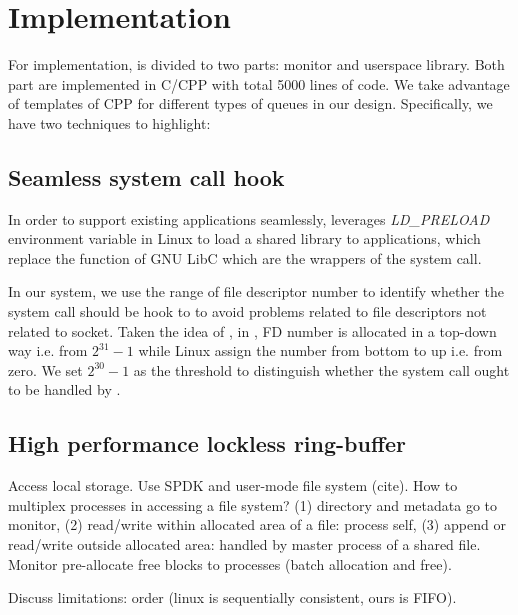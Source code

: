 \section{Implementation}
\label{sec:implementation}

For implementation, \libipc is divided to two parts: monitor and userspace library. Both part are implemented in C/CPP with total 5000 lines of code. We take advantage of templates of CPP for different types of queues in our design. Specifically, we have two techniques to highlight:
\subsection{Seamless system call hook}
\label{subsec:syscall-hook}
In order to support existing applications seamlessly, \libipc leverages \textit{LD\_PRELOAD} environment variable in Linux to load a shared library to applications, which replace the function of GNU LibC which are the wrappers of the system call. 

In our system, we use the range of file descriptor number to identify whether the system call should be hook to \libipc to avoid problems related to file descriptors not related to socket. Taken the idea of \cite{huang2017high}, in \libipc, FD number is allocated in a top-down way i.e. from $2^{31}-1$ while Linux assign the number from bottom to up i.e. from zero. We set $2^{30} - 1 $ as the threshold to distinguish whether the system call ought to be handled by \libipc.





\subsection{High performance lockless ring-buffer}


% 
% 

Access local storage. Use SPDK and user-mode file system (cite). How to multiplex processes in accessing a file system? (1) directory and metadata go to monitor, (2) read/write within allocated area of a file: process self, (3) append or read/write outside allocated area: handled by master process of a shared file. Monitor pre-allocate free blocks to processes (batch allocation and free).

Discuss limitations: order (linux is sequentially consistent, ours is FIFO).
